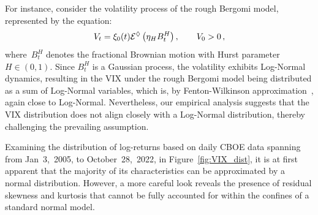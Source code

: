 For instance, consider the volatility process of the rough Bergomi model, represented by the equation:
\[
V_t = \xi_0(t) \mathcal{E}^\lozenge\left(\eta_H B_t^{H}\right), \qquad V_0>0\,,
\]
where~$B_t^{H}$ denotes the fractional Brownian motion with Hurst parameter $H\in(0,1)$. Since $B_t^{H}$ is a Gaussian process, the volatility exhibits Log-Normal dynamics, resulting in the VIX under the rough Bergomi model being distributed as a sum of Log-Normal variables, which is, by Fenton-Wilkinson approximation~\cite{Fenton1960TheSystems}, again close to Log-Normal. Nevertheless, our empirical analysis suggests that the VIX distribution does not align closely with a Log-Normal distribution, thereby challenging the prevailing assumption.

Examining the distribution of log-returns based on daily CBOE data spanning from Jan~3,~2005, to October~28,~2022, in Figure~\ref{fig:VIX_dist}, it is at first apparent that the majority of its characteristics can be approximated by a normal distribution. However, a more careful look reveals the presence of residual skewness and kurtosis that cannot be fully accounted for within the confines of a standard normal model.

